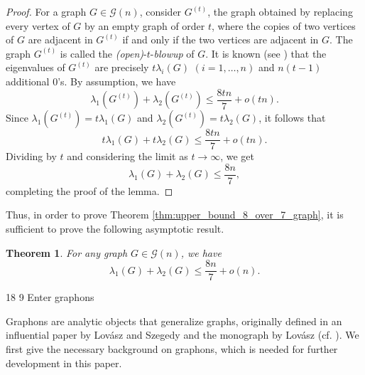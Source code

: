 \documentclass[11pt]{article}
\makeatletter
\renewcommand\section{\@startsection{section}{1}{\z@}%
{18\p@ \@plus 6\p@ \@minus 3\p@}%
{9\p@ \@plus 6\p@ \@minus 3\p@}%
{\large\bfseries\boldmath}}
\theoremstyle{plain}
\newtheorem{theorem}{Theorem}[section]
\theoremstyle{definition}
\numberwithin{equation}{section}
\makeatother
\begin{document}
\begin{proof}
For a graph $G\in \mathcal{G}(n)$, consider $G^{(t)}$, the graph obtained by replacing every 
vertex of $G$ by an empty graph of order $t$, where the copies of two vertices of $G$ are 
adjacent in $G^{(t)}$ if and only if the two vertices are adjacent in $G$. The graph $G^{(t)}$ 
is called the \emph{(open)}-$t$-\emph{blowup} of $G$. It is known (see \cite{Nikiforov_2006}) 
that the eigenvalues of $G^{(t)}$ are precisely $t\lambda_i(G)$ $(i = 1, \ldots, n)$ and $n(t-1)$ 
additional $0$'s. By assumption, we have 
\[ 
\lambda_1(G^{(t)}) + \lambda_2(G^{(t)}) \leq \frac{8tn}{7} + o(tn).
\]
Since $\lambda_1(G^{(t)}) = t\lambda_1(G)$ and $\lambda_2(G^{(t)}) = t\lambda_2(G)$, it follows that
\[ 
t\lambda_1(G) +  t\lambda_2(G) \leq \frac{8tn}{7} + o(tn).
\]
Dividing by $t$ and considering the limit as $t\rightarrow\infty$, we get
\[ 
\lambda_1(G) + \lambda_2(G) \leq \frac{8n}{7},
\] 
completing the proof of the lemma. 
\end{proof}

Thus, in order to prove Theorem \ref{thm:upper_bound_8_over_7_graph}, it is sufficient 
to prove the following asymptotic result. 

\begin{theorem}\label{thm:upper_bound_8_over_7_asymptotic} 
For any graph $G\in \mathcal{G}(n)$, we have 
\[
\lambda_1(G) + \lambda_2(G) \le \frac{8n}{7} + o(n).    
\]
\end{theorem}

\section{Enter graphons}
\label{sec:graphon_intro}

Graphons are analytic objects that generalize graphs, originally defined in an influential 
paper by Lov\'{a}sz and Szegedy \cite{Lovasz_Szegedy_2006} and the monograph by Lov\'{a}sz \cite{Lovasz_2012} (cf. \cite{Borgs_Chayes_Lovasz_Sos_Vesztergombi_2012}). 
We first give the necessary background on graphons, which is needed for further development in this paper.  
\end{document}
